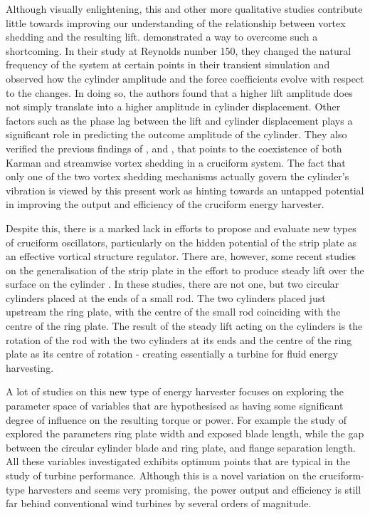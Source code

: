 \documentclass[oneside]{utmthesis}
\begin{document}
Although visually enlightening, this and other more qualitative studies contribute little towards improving our understanding of the relationship between vortex shedding and the resulting lift. \citet{Deng2007} demonstrated a way to overcome such a shortcoming. In their study at Reynolds number 150, they changed the natural frequency of the system at certain points in their transient simulation and observed how the cylinder amplitude and the force coefficients evolve with respect to the changes. In doing so, the authors found that a higher lift amplitude does not simply translate into a higher amplitude in cylinder displacement. Other factors such as the phase lag between the lift and cylinder displacement plays a significant role in predicting the outcome amplitude of the cylinder. They also verified the previous findings of \citet{Shirakashi1989}, \citet{Koide2009} and \citet{Koide2017}, that points to the coexistence of both Karman and streamwise vortex shedding in a cruciform system. The fact that only one of the two vortex shedding mechanisms actually govern the cylinder's vibration is viewed by this present work as hinting towards an untapped potential in improving the output and efficiency of the cruciform energy harvester.

Despite this, there is a marked lack in efforts to propose and evaluate new types of cruciform oscillators, particularly on the hidden potential of the strip plate as an effective vortical structure regulator. There are, however, some recent studies on the generalisation of the strip plate in the effort to produce steady lift over the surface on the cylinder \citep{Hemsuwan2018a,Hemsuwan2018b,Hemsuwan2018c,Hemsuwan2018d}. In these studies, there are not one, but two circular cylinders placed at the ends of a small rod. The two cylinders placed just upstream the ring plate, with the centre of the small rod coinciding with the centre of the ring plate. The result of the steady lift acting on the cylinders is the rotation of the rod with the two cylinders at its ends and the centre of the ring plate as its centre of rotation - creating essentially a turbine for fluid energy harvesting.

A lot of studies on this new type of energy harvester focuses on exploring the parameter space of variables that are hypothesised as having some significant degree of influence on the resulting torque or power. For example the study of \citet{Hemsuwan2021} explored the parameters ring plate width and exposed blade length, while \citet{Sakamoto2021} the gap between the circular cylinder blade and ring plate, and flange separation length. All these variables investigated exhibits optimum points that are typical in the study of turbine performance. Although this is a novel variation on the cruciform-type harvesters and seems very promising, the power output and efficiency is still far behind conventional wind turbines by several orders of magnitude.
\end{document}
